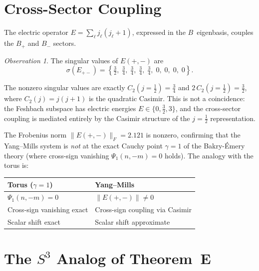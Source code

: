 \documentclass[11pt,a4paper]{article}
\theoremstyle{plain}
\theoremstyle{definition}
\theoremstyle{remark}
\newtheorem{observation}[theorem]{Observation}
\begin{document}
\section{Cross-Sector Coupling}\label{sec:cross}

The electric operator $E = \sum_\ell j_\ell(j_\ell+1)$, expressed in the
$B$~eigenbasis, couples the $B_+$ and $B_-$ sectors.

\begin{observation}
The singular values of $E(+,-)$ are
\begin{equation}
  \sigma(E_{+-}) = \left\{\tfrac{3}{2},\; \tfrac{3}{4},\; \tfrac{3}{4},\;
  \tfrac{3}{4},\; \tfrac{3}{4},\; 0,\; 0,\; 0,\; 0\right\}.
\end{equation}
\end{observation}

The nonzero singular values are exactly $C_2(j{=}\tfrac{1}{2}) =
\tfrac{3}{4}$ and $2\,C_2(j{=}\tfrac{1}{2}) = \tfrac{3}{2}$, where
$C_2(j) = j(j+1)$ is the quadratic Casimir.  This is not a coincidence:
the Feshbach subspace has electric energies $E \in \{0, \tfrac{3}{2},
3\}$, and the cross-sector coupling is mediated entirely by the Casimir
structure of the $j = \tfrac{1}{2}$ representation.

The Frobenius norm $\|E(+,-)\|_F = 2.121$ is nonzero, confirming that
the Yang--Mills system is \emph{not} at the exact Cauchy point
$\gamma=1$ of the Bakry-\'{E}mery theory (where cross-sign vanishing
$\Psi_1(n,-m) = 0$ holds).  The analogy with the torus is:
\begin{center}
\begin{tabular}{ll}
\toprule
Torus ($\gamma = 1$) & Yang--Mills \\
\midrule
$\Psi_1(n,-m) = 0$ & $\|E(+,-)\| \neq 0$ \\
Cross-sign vanishing exact & Cross-sign coupling via Casimir \\
Scalar shift exact & Scalar shift approximate \\
\bottomrule
\end{tabular}
\end{center}

\section{The $S^3$ Analog of Theorem~E}\label{sec:S3}
\end{document}
